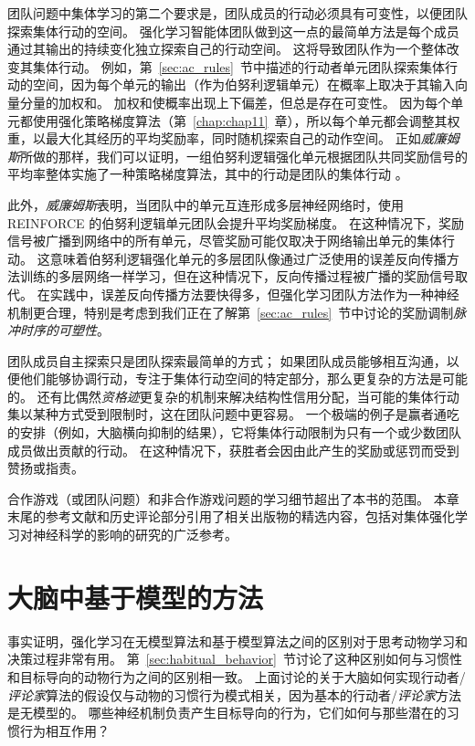 团队问题中集体学习的第二个要求是，团队成员的行动必须具有可变性，以便团队探索集体行动的空间。
强化学习智能体团队做到这一点的最简单方法是每个成员通过其输出的持续变化独立探索自己的行动空间。
这将导致团队作为一个整体改变其集体行动。
例如，第~\ref{sec:ac_rules}~节中描述的行动者单元团队探索集体行动的空间，因为每个单元的输出（作为伯努利逻辑单元）在概率上取决于其输入向量分量的加权和。
加权和使概率出现上下偏差，但总是存在可变性。
因为每个单元都使用强化策略梯度算法（第~\ref{chap:chap11}~章），所以每个单元都会调整其权重，以最大化其经历的平均奖励率，同时随机探索自己的动作空间。
正如\textit{威廉姆斯}\cite{williams1992simple}所做的那样，我们可以证明，一组伯努利逻辑强化单元根据团队共同奖励信号的平均率整体实施了一种策略梯度算法，其中的行动是团队的集体行动 。


此外，\textit{威廉姆斯}\cite{williams1992simple}表明，当团队中的单元互连形成多层神经网络时，使用 REINFORCE 的伯努利逻辑单元团队会提升平均奖励梯度。
在这种情况下，奖励信号被广播到网络中的所有单元，尽管奖励可能仅取决于网络输出单元的集体行动。
这意味着伯努利逻辑强化单元的多层团队像通过广泛使用的误差反向传播方法训练的多层网络一样学习，但在这种情况下，反向传播过程被广播的奖励信号取代。
在实践中，误差反向传播方法要快得多，但强化学习团队方法作为一种神经机制更合理，特别是考虑到我们正在了解第~\ref{sec:ac_rules}~节中讨论的奖励调制\textit{脉冲时序的可塑性}。


团队成员自主探索只是团队探索最简单的方式；
如果团队成员能够相互沟通，以便他们能够协调行动，专注于集体行动空间的特定部分，那么更复杂的方法是可能的。
还有比偶然\textit{资格迹}更复杂的机制来解决结构性信用分配，当可能的集体行动集以某种方式受到限制时，这在团队问题中更容易。
一个极端的例子是赢者通吃的安排（例如，大脑横向抑制的结果），它将集体行动限制为只有一个或少数团队成员做出贡献的行动。
在这种情况下，获胜者会因由此产生的奖励或惩罚而受到赞扬或指责。


合作游戏（或团队问题）和非合作游戏问题的学习细节超出了本书的范围。
本章末尾的参考文献和历史评论部分引用了相关出版物的精选内容，包括对集体强化学习对神经科学的影响的研究的广泛参考。


\section{大脑中基于模型的方法}

事实证明，强化学习在无模型算法和基于模型算法之间的区别对于思考动物学习和决策过程非常有用。
第~\ref{sec:habitual_behavior}~节讨论了这种区别如何与习惯性和目标导向的动物行为之间的区别相一致。
上面讨论的关于大脑如何实现行动者/\textit{评论家}算法的假设仅与动物的习惯行为模式相关，因为基本的行动者/\textit{评论家}方法是无模型的。
哪些神经机制负责产生目标导向的行为，它们如何与那些潜在的习惯行为相互作用？


